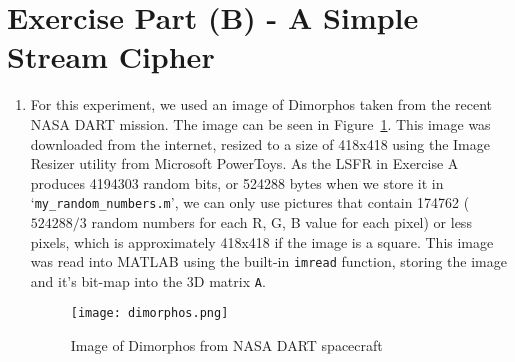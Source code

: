 \section*{Exercise Part (B) - A Simple Stream Cipher}

\begin{enumerate}[wide, label=(B\arabic*)]

\item
For this experiment, we used an image of Dimorphos taken from the recent NASA DART mission. The image can be seen in Figure~\ref{fig:B1}. This image was downloaded from the internet, resized to a size of 418x418 using the Image Resizer utility from Microsoft PowerToys. As the LSFR in Exercise A produces 4194303 random bits, or 524288 bytes when we store it in `\texttt{my\_random\_numbers.m}', we can only use pictures that contain 174762 ($524288 / 3$ random numbers for each R, G, B value for each pixel) or less pixels, which is approximately 418x418 if the image is a square. This image was read into MATLAB using the built-in \texttt{imread} function, storing the image and it's bit-map into the 3D matrix \texttt{A}. 
\begin{figure}[htp]
    \centering
    \texttt{[image: dimorphos.png]}
    \caption{\label{fig:B1}Image of Dimorphos from NASA DART spacecraft}
\end{figure}


\end{enumerate}
